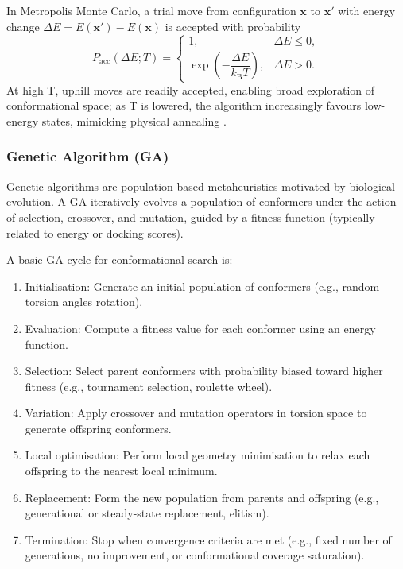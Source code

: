 \documentclass[12pt]{article}
\begin{document}
In Metropolis Monte Carlo\cite{CH2_Metropolis1953}, a trial move from configuration  \(\mathbf{x}\) to \(\mathbf{x}'\) with energy change \(\Delta E = E(\mathbf{x}') - E(\mathbf{x})\) is accepted with probability
\begin{equation}
    P_{\mathrm{acc}}(\Delta E;T) =
    \begin{cases}
        1, & \Delta E \le 0, \\
        \exp\!\left(-\dfrac{\Delta E}{k_{\mathrm{B}} T}\right), & \Delta E > 0.
    \end{cases}
      \label{eq:MC_accept}
\end{equation}
At high T, uphill moves are readily accepted, enabling broad exploration of conformational space; as T is lowered, the algorithm increasingly favours low-energy states, mimicking physical annealing \cite{CH2_Kirkpatrick1983}.

\subsubsection{Genetic Algorithm (GA)}

Genetic algorithms are population-based metaheuristics motivated by biological evolution.\cite{CH2_Judson1993,CH2_Goodman1998} A GA iteratively evolves a population of conformers under the action of selection, crossover, and mutation, guided by a fitness function (typically related to energy or docking scores).

A basic GA cycle for conformational search is:

\begin{enumerate}
\item Initialisation: Generate an initial population of conformers (e.g., random torsion angles rotation).
\item Evaluation: Compute a fitness value for each conformer using an energy function.
\item Selection: Select parent conformers with probability biased toward higher fitness (e.g., tournament selection, roulette wheel).
\item Variation: Apply crossover and mutation operators in torsion space to generate offspring conformers.
\item Local optimisation: Perform local geometry minimisation to relax each offspring to the nearest local minimum.
\item Replacement: Form the new population from parents and offspring (e.g., generational or steady-state replacement, elitism).
\item Termination: Stop when convergence criteria are met (e.g., fixed number of generations, no improvement, or conformational coverage saturation).
\end{enumerate}
\end{document}
